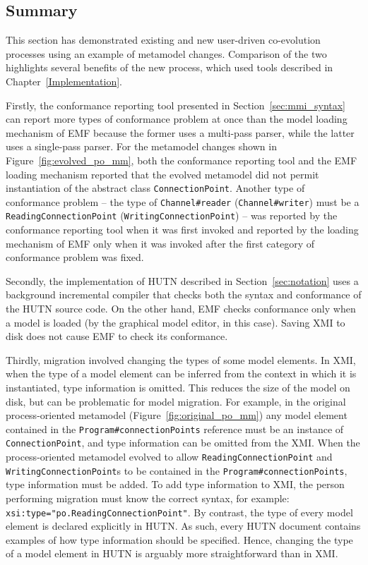 \subsection{Summary}
This section has demonstrated existing and new user-driven co-evolution processes using an example of metamodel changes. Comparison of the two highlights several benefits of the new process, which used tools described in Chapter~\ref{Implementation}.

Firstly, the conformance reporting tool presented in Section~\ref{sec:mmi_syntax} can report more types of conformance problem at once than the model loading mechanism of EMF because the former uses a multi-pass parser, while the latter uses a single-pass parser. For the metamodel changes shown in Figure~\ref{fig:evolved_po_mm}, both the conformance reporting tool and the EMF loading mechanism reported that the evolved metamodel did not permit instantiation of the abstract class \texttt{Co\-nn\-ec\-ti\-o\-nPo\-i\-nt}. Another type of conformance problem -- the type of \texttt{Ch\-an\-n\-el\#re\-ad\-er} (\texttt{Ch\-an\-n\-el\#wr\-it\-er}) must be a \texttt{Re\-ad\-i\-ngCo\-nn\-ec\-ti\-o\-nPo\-i\-nt} (\texttt{Wr\-i\-ti\-ngCo\-nn\-ec\-ti\-o\-nPo\-i\-nt}) -- was reported by the conformance reporting tool when it was first invoked and reported by the loading mechanism of EMF only when it was invoked after the first category of conformance problem was fixed.

Secondly, the implementation of HUTN described in Section~\ref{sec:notation} uses a background incremental compiler that checks both the syntax and conformance of the HUTN source code. On the other hand, EMF checks conformance only when a model is loaded (by the graphical model editor, in this case). Saving XMI to disk does not cause EMF to check its conformance.

Thirdly, migration involved changing the types of some model elements. In XMI, when the type of a model element can be inferred from the context in which it is instantiated, type information is omitted. This reduces the size of the model on disk, but can be problematic for model migration. For example, in the original process-oriented metamodel (Figure~\ref{fig:original_po_mm}) any model element contained in the \texttt{Pr\-og\-r\-am\#co\-nn\-ec\-ti\-onPo\-in\-ts} reference must be an instance of \texttt{Co\-nn\-ec\-ti\-onPo\-in\-t}, and type information can be omitted from the XMI. When the process-oriented metamodel evolved to allow \texttt{Re\-ad\-i\-ngCo\-nn\-ec\-ti\-o\-nPo\-i\-nt} and \texttt{Wr\-i\-ti\-ngCo\-nn\-ec\-ti\-o\-nPo\-i\-nt}s to be contained in the \texttt{Pr\-og\-r\-am\#co\-nn\-ec\-ti\-onPo\-in\-ts}, type information must be added. To add type information to XMI, the person performing migration must know the correct syntax, for example: \texttt{xsi:type="po.Re\-ad\-i\-ngCo\-nn\-ec\-ti\-onPo\-i\-nt"}. By contrast, the type of every model element is declared explicitly in HUTN. As such, every HUTN document contains examples of how type information should be specified. Hence, changing the type of a model element in HUTN is arguably more straightforward than in XMI.

